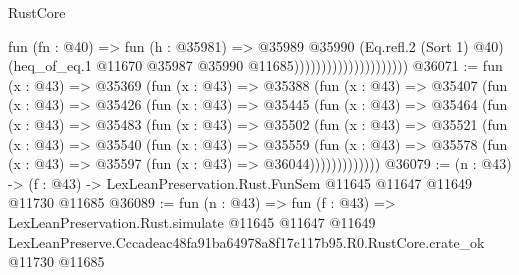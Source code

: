 \begin{lexlean}{RustCore}
\begin{coremodule}
                                          fun (fn : @40) =>
                                          fun (h : @35981) =>
                                          @35989
                                            @35990
                                            (Eq.refl.{2} (Sort 1) @40)
                                            (heq_of_eq.{1}
                                              @11670
                                              @35987
                                              @35990
                                              @11685)))))))))))))))))))))
@36071 := fun (x : @43) =>
  @35369
    (fun (x : @43) =>
    @35388
      (fun (x : @43) =>
      @35407
        (fun (x : @43) =>
        @35426
          (fun (x : @43) =>
          @35445
            (fun (x : @43) =>
            @35464
              (fun (x : @43) =>
              @35483
                (fun (x : @43) =>
                @35502
                  (fun (x : @43) =>
                  @35521
                    (fun (x : @43) =>
                    @35540
                      (fun (x : @43) =>
                      @35559
                        (fun (x : @43) =>
                        @35578 (fun (x : @43) => @35597 (fun (x : @43) => @36044)))))))))))))
@36079 := (n : @43) ->
  (f : @43) -> LexLeanPreservation.Rust.FunSem @11645 @11647 @11649 @11730 @11685
@36089 := fun (n : @43) =>
  fun (f : @43) =>
  LexLeanPreservation.Rust.simulate
    @11645
    @11647
    @11649
    LexLeanPreserve.Cccadeac48fa91ba64978a8f17c117b95.R0.RustCore.crate_ok
    @11730
    @11685
\end{coremodule}
\end{lexlean}
